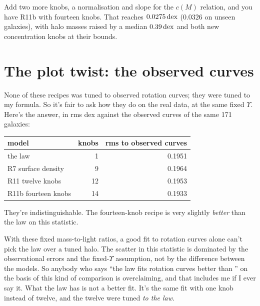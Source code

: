 Add two more knobs, a normalisation and slope for the $c(M)$ relation, and you have R11b with fourteen knobs. That reaches $0.0275\,\mathrm{dex}$ ($0.0326$ on unseen galaxies), with halo masses raised by a median $0.39\,\mathrm{dex}$ and both new concentration knobs at their bounds.

\section{The plot twist: the observed curves}

None of these recipes was tuned to observed rotation curves; they were tuned to my formula. So it's fair to ask how they do on the real data, at the same fixed $\Upsilon$. Here's the answer, in rms dex against the observed curves of the same 171 galaxies:

\begin{center}
\begin{tabular}{lrr}
\toprule
model & knobs & rms to observed curves\\
\midrule
the law & 1 & 0.1951\\
R7 surface density & 9 & 0.1964\\
R11 twelve knobs & 12 & 0.1953\\
R11b fourteen knobs & 14 & 0.1933\\
\bottomrule
\end{tabular}
\end{center}

They're indistinguishable. The fourteen-knob recipe is very slightly \emph{better} than the law on this statistic.



\begin{honestbox}
With these fixed mass-to-light ratios, a good fit to rotation curves alone can't pick the law over a tuned halo. The scatter in this statistic is dominated by the observational errors and the fixed-$\Upsilon$ assumption, not by the difference between the models. So anybody who says ``the law fits rotation curves better than \LCDM'' on the basis of this kind of comparison is overclaiming, and that includes me if I ever say it. What the law has is not a better fit. It's the same fit with one knob instead of twelve, and the twelve were tuned \emph{to the law}.
\end{honestbox}

